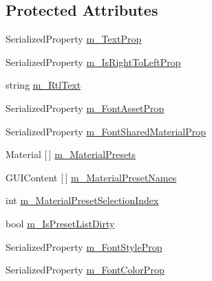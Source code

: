 \subsection*{Protected Attributes}
\begin{DoxyCompactItemize}
\item 
Serialized\+Property \mbox{\hyperlink{class_t_m_pro_1_1_editor_utilities_1_1_t_m_p___base_editor_panel_a991c4a491416d364765a0a86b807347d}{m\+\_\+\+Text\+Prop}}
\item 
Serialized\+Property \mbox{\hyperlink{class_t_m_pro_1_1_editor_utilities_1_1_t_m_p___base_editor_panel_a262fa817da942aee16591a55570ee03d}{m\+\_\+\+Is\+Right\+To\+Left\+Prop}}
\item 
string \mbox{\hyperlink{class_t_m_pro_1_1_editor_utilities_1_1_t_m_p___base_editor_panel_a34c8c19f6120043cc0b5a49ba48a64f7}{m\+\_\+\+Rtl\+Text}}
\item 
Serialized\+Property \mbox{\hyperlink{class_t_m_pro_1_1_editor_utilities_1_1_t_m_p___base_editor_panel_a976912bc614e51841557ec130b9439a3}{m\+\_\+\+Font\+Asset\+Prop}}
\item 
Serialized\+Property \mbox{\hyperlink{class_t_m_pro_1_1_editor_utilities_1_1_t_m_p___base_editor_panel_a978d88300f0df1ee1bfdaa7774d1cf75}{m\+\_\+\+Font\+Shared\+Material\+Prop}}
\item 
Material \mbox{[}$\,$\mbox{]} \mbox{\hyperlink{class_t_m_pro_1_1_editor_utilities_1_1_t_m_p___base_editor_panel_a4bcdddccc59dfae51926d2cd5253ee4a}{m\+\_\+\+Material\+Presets}}
\item 
G\+U\+I\+Content \mbox{[}$\,$\mbox{]} \mbox{\hyperlink{class_t_m_pro_1_1_editor_utilities_1_1_t_m_p___base_editor_panel_a8fb56a2db6642231920c33c46e7e23db}{m\+\_\+\+Material\+Preset\+Names}}
\item 
int \mbox{\hyperlink{class_t_m_pro_1_1_editor_utilities_1_1_t_m_p___base_editor_panel_a1c27cda56ff99eb5d2c579dc2c89dd9f}{m\+\_\+\+Material\+Preset\+Selection\+Index}}
\item 
bool \mbox{\hyperlink{class_t_m_pro_1_1_editor_utilities_1_1_t_m_p___base_editor_panel_aa15bf87616246d6dedbfb2f78167bcbb}{m\+\_\+\+Is\+Preset\+List\+Dirty}}
\item 
Serialized\+Property \mbox{\hyperlink{class_t_m_pro_1_1_editor_utilities_1_1_t_m_p___base_editor_panel_ae1d8ba8e6d97f28d66c3cdd5cc3ebdbe}{m\+\_\+\+Font\+Style\+Prop}}
\item 
Serialized\+Property \mbox{\hyperlink{class_t_m_pro_1_1_editor_utilities_1_1_t_m_p___base_editor_panel_a34fe2a359e1d6dd321692942bf640713}{m\+\_\+\+Font\+Color\+Prop}}

\end{DoxyCompactItemize}
